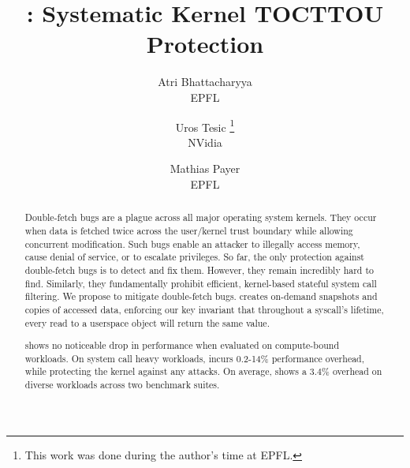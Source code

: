 \documentclass[letterpaper,twocolumn,10pt]{article}
\begin{document}
\newcommand{\footremember}[2]{%
   \footnote{#2}
    \newcounter{#1}
    \setcounter{#1}{\value{footnote}}%
}
\newcommand{\footrecall}[1]{%
    \footnotemark[\value{#1}]%
} 

\date{}

\title{\Large \bf \midas: Systematic Kernel TOCTTOU Protection}

\author{
{\rm Atri Bhattacharyya} \\
EPFL
\and
{\rm Uros Tesic} \thanks{This work was done during the author's time at EPFL.}\\
NVidia
\and
{\rm Mathias Payer}\\
EPFL
} %
\maketitle

\begin{abstract}
Double-fetch bugs are a plague across all major operating system kernels. They
occur when data is fetched twice across the user/kernel trust boundary while 
allowing concurrent modification. Such bugs enable an attacker to illegally 
access memory, cause denial of service, or to escalate privileges. 
%
So far, the only protection against double-fetch bugs is to detect and fix them.
However, they remain incredibly hard to find. 
%
Similarly,
they fundamentally prohibit efficient, kernel-based stateful system call filtering.
We propose \midas to mitigate double-fetch bugs. \midas creates on-demand
snapshots and copies of accessed data, enforcing our key invariant
that throughout a syscall's lifetime, every read to a userspace object 
will return the same value.

\midas shows no noticeable drop in performance when evaluated on compute-bound
workloads. On system call heavy workloads, \midas incurs 0.2-14\%
performance overhead, while protecting the kernel
against any \tocttou attacks. On average, \midas shows a $3.4\%$ overhead on
diverse workloads across two benchmark suites.

\end{abstract}
\end{document}
